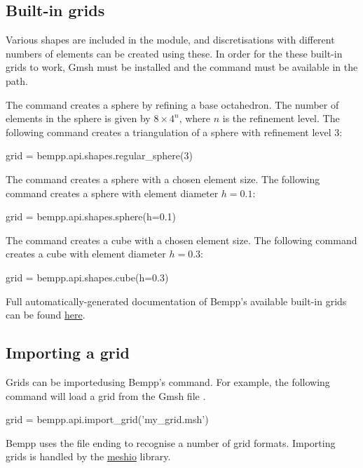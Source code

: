 \documentclass[a4paper]{book}
\begin{document}
\subsection{ Built-in grids}Various shapes are included in the  module, and discretisations with
different numbers of elements can be created using these.
In order for the these built-in grids to work, Gmsh must be
installed and the command  must be available in the path.

The command  creates a sphere by refining a
base octahedron. The number of elements in the sphere is given by
$8 \times 4^n$, where $n$ is the refinement level.
The following command creates a triangulation of a sphere with refinement level 3:

\begin{python}
grid = bempp.api.shapes.regular_sphere(3)
\end{python}

The command  creates a sphere with a chosen element size.
The following command creates a sphere with element diameter $h=0.1$:

\begin{python}
grid = bempp.api.shapes.sphere(h=0.1)
\end{python}

The command  creates a cube with a chosen element size.
The following command creates a cube with element diameter $h=0.3$:

\begin{python}
grid = bempp.api.shapes.cube(h=0.3)
\end{python}

Full automatically-generated documentation of Bempp's available built-in grids can be found
\href{https://bempp-cl.readthedocs.io/en/latest/docs/bempp/api/shapes/index.html}{here}.

\subsection{ Importing a grid}Grids can be importedusing Bempp's  command.
For example, the following command will load a grid from the Gmsh file .

\begin{python}
grid = bempp.api.import_grid('my_grid.msh')
\end{python}

Bempp uses the file ending to recognise a number of grid formats.
Importing grids is handled by the \href{https://github.com/nschloe/meshio}{meshio} library.
    
\end{document}
